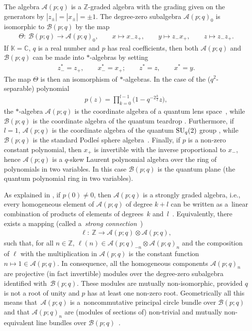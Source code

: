 \documentclass[pdftex]{sigma}
\numberwithin{equation}{section}
\def\Weyl#1#2{{\mathcal{B}}(#1;#2)}
\def\AWeyl#1#2{{\mathcal{A}}(#1;#2)}
\begin{document}
The algebra $\AWeyl p q$ is a ${\mathbb Z}$-graded algebra with the grading given on the generators by $|z_\pm | =|x_\pm| = \pm 1$. The degree-zero subalgebra ${\AWeyl p q}_0$ is isomorphic to $\Weyl p q$ by the map
\begin{gather}\label{theta}
\Theta\colon \ \Weyl p q \to {\AWeyl p q}_0, \qquad x\mapsto x_-z_+, \qquad y\mapsto z_-x_+, \qquad z\mapsto z_-z_+.
\end{gather}
If ${\mathbb K} ={\mathbb C}$, $q$ is a real number and $p$ has real coef\/f\/icients, then both $\AWeyl p q$ and $\Weyl p q$ can be made into $*$-algebras by setting
\begin{gather}\label{star}
z_-^* = z_+, \qquad x_-^* = x_+; \qquad z^*=z, \qquad x^* =y.
\end{gather}
The map $\Theta$ is then an isomorphism of $*$-algebras. In the case of the ($q^2$-separable) polynomial
\begin{gather*}
p(z) = \prod_{k=0}^{l-1}\big(1- q^{-2\frac{k}l}z\big),
\end{gather*}
the $*$-algebra $\AWeyl p q$ is the coordinate algebra of a quantum lens space~\cite{HonSzy:len}, while $\Weyl p q$ is the coordinate algebra of the quantum teardrop \cite{BrzFai:tea}. Furthermore, if $l=1$, $\AWeyl p q$ is the coordinate algebra of the quantum ${\rm SU}_q(2)$ group \cite{Wor:com}, while $\Weyl p q$ is the standard Podle\'s sphere algebra~\cite{Pod:sph}. Finally, if $p$ is a non-zero constant polynomial, then $x_+$ is invertible with the inverse proportional to $x_-$, hence $\AWeyl p q$ is a $q$-skew Laurent polynomial algebra over the ring of polynomials in two variables. In this case $\Weyl p q$ is the quantum plane (the quantum polynomial ring in two variables).

As explained in \cite[Theorem~3.7]{Brz:gen}, if $p(0)\neq 0$, then $\AWeyl p q$ is a strongly graded algebra, i.e., every homogeneous element of $\AWeyl p q$ of degree $k+l$ can be written as a~linear combination of products of elements of degrees~$k$ and~$l$~\cite{Dad:gro,NasVan:gra}. Equivalently, there exists a mapping (called a~{\em strong connection}~\cite{Haj:str})
\begin{gather*}
\ell \colon \ {\mathbb Z} \to \AWeyl p q \otimes \AWeyl p q,
\end{gather*}
such that, for all $n\in {\mathbb Z}$, $\ell(n) \in \AWeyl p q_{-n} \otimes \AWeyl p q_n$ and the composition of $\ell$ with the multiplication in $\AWeyl p q$ is the constant function $n\mapsto 1 \in \AWeyl p q$. In consequence, all the homogeneous components $\AWeyl p q_{n}$ are projective (in fact invertible) modules over the degree-zero subalgebra identif\/ied with~$\Weyl p q$. These modules are mutually non-isomorphic, provided $q$ is not a root of unity and $p$ has at least one non-zero root. Geometrically all this means that~$\AWeyl p q$ is a~noncommutative principal circle bundle over $\Weyl p q$ and that $\AWeyl p q_{n}$ are (modules of sections of) non-trivial and mutually non-equivalent line bundles over $\Weyl p q$~\cite{BrzMaj:gau}.
\end{document}
